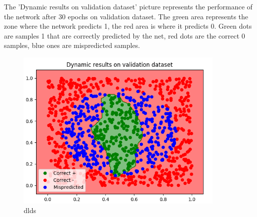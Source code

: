 \begin{minipage}{0.45\textwidth} 
	The 'Dynamic results on validation dataset' picture represents the performance of the network after 30 epochs on validation dataset. The green area represents the zone where the network predicts 1, the red area is where it predicts 0. Green dots are samples 1 that are correctly predicted by the net, red dots are the correct 0 samples, blue ones are mispredicted samples.
\end{minipage}
\begin{minipage}{0.5\textwidth} \raggedleft 
	\begin{figure}[H]
		\includegraphics[width=0.9\textwidth]{Images/30epochs.png}
		\centering
		\caption{dlds}
		\centering
	\end{figure}
\end{minipage}


